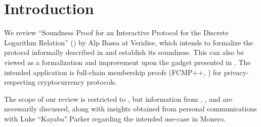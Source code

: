 \documentclass{article}
\theoremstyle{definition}
\newcommand{\6}{\mathbf}
\newcommand{\7}{\mathcal}
\begin{document}







    



\section{Introduction}

We review ``Soundness Proof for an Interactive Protocol for the Discrete Logarithm Relation'' (\cite{BassaSoundnessIPDL}) by Alp Bassa at Veridise, which intends to formalize the protocol informally described in \cite{Eagen22} and establish its soundness. This can also be viewed as a formalization and improvement upon the gadget presented in \cite{KayabaR1CS}.
The intended application is full-chain membership proofs (FCMP++, \cite{KayabaFCMP}) for privacy-respecting cryptocurrency protocols.
\smallskip 

The scope of our review is restricted to \cite{BassaSoundnessIPDL}, but information from \cite{Eagen22}, \cite{BassaLogDerivSoP}, and \cite{BassaSoundnessProofSoP} are necessarily discussed, along with insights obtained from personal communications with Luke ``Kayaba" Parker regarding the intended use-case in Monero.
\end{document}

